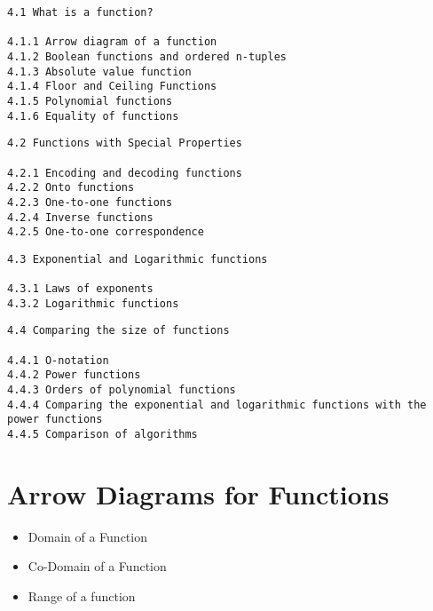 \documentclass{article}
\begin{document}
\tableofcontents
\newpage
\begin{framed}
\begin{verbatim}
4.1 What is a function?     
	 
4.1.1 Arrow diagram of a function   
4.1.2 Boolean functions and ordered n-tuples   
4.1.3 Absolute value function   
4.1.4 Floor and Ceiling Functions    
4.1.5 Polynomial functions    
4.1.6 Equality of functions  
\end{verbatim}
\end{framed}
\begin{framed}
\begin{verbatim}
4.2 Functions with Special Properties    

4.2.1 Encoding and decoding functions    
4.2.2 Onto functions     
4.2.3 One-to-one functions    
4.2.4 Inverse functions     
4.2.5 One-to-one correspondence   
\end{verbatim}
\end{framed}
\begin{framed}
	\begin{verbatim}
4.3 Exponential and Logarithmic functions   
 
4.3.1 Laws of exponents     
4.3.2 Logarithmic functions
\end{verbatim}
\end{framed}
\begin{framed}
	\begin{verbatim}
4.4 Comparing the size of functions    

4.4.1 O-notation     
4.4.2 Power functions    
4.4.3 Orders of polynomial functions    
4.4.4 Comparing the exponential and logarithmic functions with the power functions
4.4.5 Comparison of algorithms 
\end{verbatim}
\end{framed}

\newpage
\section*{Arrow Diagrams for Functions}
\begin{itemize}
	\item Domain of a Function
	\item Co-Domain of a Function
	\item Range of a function
\end{itemize}

\end{document}
